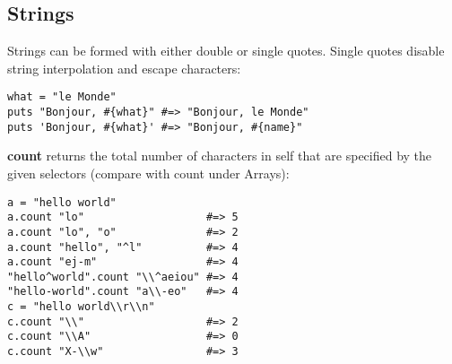 %

\subsection{Strings}
Strings can be formed with either double or single quotes.
Single quotes disable string interpolation and escape characters:
\begin{verbatim}
what = "le Monde"
puts "Bonjour, #{what}" #=> "Bonjour, le Monde"
puts 'Bonjour, #{what}' #=> "Bonjour, #{name}"
\end{verbatim}

\textbf{count} returns the total number of characters in self that are specified by the given selectors (compare with count under Arrays):
\begin{verbatim}
a = "hello world"
a.count "lo"                   #=> 5
a.count "lo", "o"              #=> 2
a.count "hello", "^l"          #=> 4
a.count "ej-m"                 #=> 4
"hello^world".count "\\^aeiou" #=> 4
"hello-world".count "a\\-eo"   #=> 4
c = "hello world\\r\\n"
c.count "\\"                   #=> 2
c.count "\\A"                  #=> 0
c.count "X-\\w"                #=> 3
\end{verbatim}





